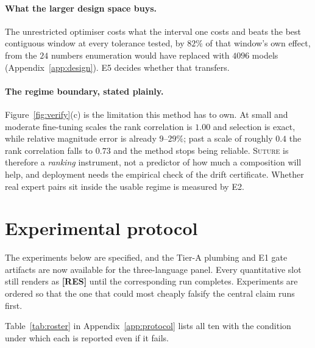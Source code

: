 \documentclass[10pt]{article}
\theoremstyle{plain}
\theoremstyle{definition}
\theoremstyle{remark}
\DeclareRobustCommand{\RES}[1][]{{\color{resred}\textbf{[RES#1]}}}
\begin{document}
\paragraph{What the larger design space buys.}
The unrestricted optimiser costs what the interval one costs and beats the best
contiguous window at every tolerance tested, by $82\%$ of that window's own
effect, from the $24$ numbers enumeration would have replaced with $4096$ models
(Appendix~\ref{app:design}). E5 decides whether that transfers.


\paragraph{The regime boundary, stated plainly.}
Figure~\ref{fig:verify}(c) is the limitation this method has to own. At small and
moderate fine-tuning scales the rank correlation is $1.00$ and selection is
exact, while relative magnitude error is already $9$--$29\%$; past a scale of
roughly $0.4$ the rank correlation falls to $0.73$ and the method stops being
reliable. \textsc{Suture} is therefore a \emph{ranking} instrument, not a
predictor of how much a composition will help, and deployment needs the empirical
check of the drift certificate. Whether real expert pairs sit inside
the usable regime is measured by E2.

\section{Experimental protocol}
\label{sec:protocol}

The experiments below are specified, and the Tier-A plumbing and E1 gate
artifacts are now available for the three-language panel. Every quantitative
slot still renders as \RES{} until the corresponding run completes. Experiments
are ordered so that the one that could most cheaply falsify the central claim
runs first.

Table~\ref{tab:roster} in Appendix~\ref{app:protocol} lists all ten with the
condition under which each is reported even if it fails.
\end{document}

